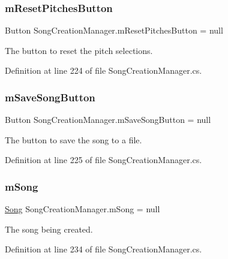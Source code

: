\subsubsection{\texorpdfstring{m\+Reset\+Pitches\+Button}{mResetPitchesButton}}
{\footnotesize\ttfamily Button Song\+Creation\+Manager.\+m\+Reset\+Pitches\+Button = null\hspace{0.3cm}{\ttfamily [private]}}



The button to reset the pitch selections. 



Definition at line 224 of file Song\+Creation\+Manager.\+cs.

\mbox{\label{group___s_c_m_priv_var_gaf43eabc869ead30d8ac7027e07502289}} 
\subsubsection{\texorpdfstring{m\+Save\+Song\+Button}{mSaveSongButton}}
{\footnotesize\ttfamily Button Song\+Creation\+Manager.\+m\+Save\+Song\+Button = null\hspace{0.3cm}{\ttfamily [private]}}



The button to save the song to a file. 



Definition at line 225 of file Song\+Creation\+Manager.\+cs.

\mbox{\label{group___s_c_m_priv_var_gabd8329149faef65a689650d951a9abc9}} 
\subsubsection{\texorpdfstring{m\+Song}{mSong}}
{\footnotesize\ttfamily \hyperlink{class_song}{Song} Song\+Creation\+Manager.\+m\+Song = null\hspace{0.3cm}{\ttfamily [private]}}



The song being created. 



Definition at line 234 of file Song\+Creation\+Manager.\+cs.

